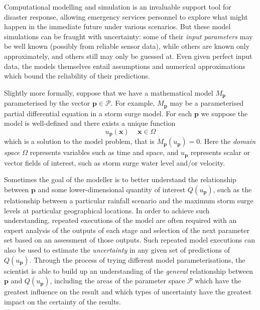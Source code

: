 \documentclass[a4paper,fontsize=13pt]{scrartcl}
\begin{document}
Computational modelling and simulation is an invaluable support tool for disaster response,
 allowing  emergency services personnel to explore 
what might happen in the immediate future 
under various scenarios. But these model simulations can be fraught with uncertainty: 
some of their {\em input parameters}  may be well
known (possibly from reliable sensor data), while others are known only approximately, and others still may
only be guessed at. Even given perfect input data, the models themselves entail assumptions and numerical approximations which bound the reliability of their predictions. 

Slightly more formally, suppose that we have a mathematical model $M_{\mathbf{p}}$
parameterised by the vector $\mathbf{p}\in\mathcal{P}$. For example, $M_{\mathbf{p}}$ may
be a parameterised partial differential equation %
in a storm
surge model.
For each $\mathbf{p}$ we suppose the model is
well-defined and there exists a unique function
\begin{equation}
  \label{eq:1}
  u_{\mathbf{p}}(\mathbf{x})\, \quad \mathbf{x}\in\Omega
\end{equation}
which is a solution to the model problem, that is $M_{\mathbf{p}}(u_{\mathbf{p}})=0$.
Here the {\em domain space} $\Omega$ represents variables such as 
time and space, 
and $u_{\mathbf{p}}$ represents scalar or vector fields of interest, 
such as storm surge water level and/or velocity.    

Sometimes the goal of the modeller is to better understand the relationship
between $\mathbf{p}$ and some lower-dimensional quantity of interest
$Q(u_{\mathbf{p}})$, such as the relationship between a particular rainfall scenario and the maximum storm surge levels at particular geographical locations. In order to achieve such understanding, repeated executions of the model are often required with an expert analysis of the outputs of each stage and selection of the next parameter set based on an assessment of those outputs. Such repeated model executions can also be used to estimate the {\em uncertainty} in any given set of predictions of 
$Q(u_{\mathbf{p}})$. Through the process
of trying different model parameterisations, the scientist is able to
build up an understanding of the \emph{general} relationship between
$\mathbf{p}$ and $Q(u_{\mathbf{p}})$, including the areas of the
parameter space $\mathcal{P}$ which have the greatest influence on the
result and which
types of uncertainty have the greatest impact on the certainty of the
results.
\end{document}
